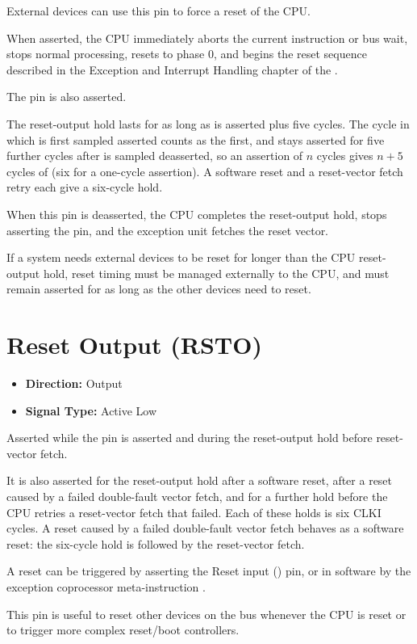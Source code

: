 External devices can use this pin to force a reset of the CPU.

When asserted, the CPU immediately aborts the current instruction or bus wait, stops normal processing, resets to phase
0, and begins the reset sequence described in the Exception and Interrupt Handling chapter of the \archmanual{}.

The  pin is also asserted.

The reset-output hold lasts for as long as  is asserted plus five cycles. The cycle in which
 is first sampled asserted counts as the first, and  stays asserted for five further
cycles after  is sampled deasserted, so an  assertion of $n$ cycles gives $n + 5$
cycles of  (six for a one-cycle assertion). A software reset and a reset-vector fetch retry each give a
six-cycle hold.

When this pin is deasserted, the CPU completes the reset-output hold, stops asserting the  pin, and the
exception unit fetches the reset vector.

If a system needs external devices to be reset for longer than the CPU reset-output hold, reset timing must be managed
externally to the CPU, and  must remain asserted for as long as the other devices need to reset.

\section{Reset Output (RSTO)}

\begin{itemize}
	\item \textbf{Direction:} Output
	\item \textbf{Signal Type:} Active Low
\end{itemize}

Asserted while the  pin is asserted and during the reset-output hold before reset-vector fetch.

It is also asserted for the reset-output hold after a software reset, after a reset caused by a failed double-fault
vector fetch, and for a further hold before the CPU retries a reset-vector fetch that failed. Each of these holds is
six CLKI cycles. A reset caused by a failed double-fault vector fetch behaves as a software reset: the six-cycle
 hold is followed by the reset-vector fetch.

A reset can be triggered by asserting the Reset input () pin, or in software by the exception
coprocessor meta-instruction .

This pin is useful to reset other devices on the bus whenever the CPU is reset or to trigger more complex reset/boot
controllers.
